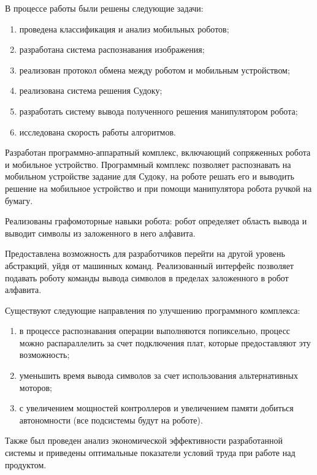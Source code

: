 \Conclusion %

В процессе работы были решены следующие задачи:

\begin{enumerate}
    \item проведена классификация и анализ мобильных роботов;
	\item разработана система распознавания изображения;
	\item реализован протокол обмена между роботом и мобильным устройством; 
	\item реализована система решения Судоку;
	\item разработать систему вывода полученного решения манипулятором робота;
	\item исследована скорость работы алгоритмов.
\end{enumerate}

Разработан программно-аппаратный комплекс, включающий сопряженных робота и мобильное устройство. Программный комплекс позволяет распознавать на мобильном устройстве задание для Судоку, на роботе решать его и выводить решение на мобильное устройство и при помощи манипулятора робота ручкой на бумагу.

Реализованы графомоторные навыки робота: робот определяет область вывода и выводит символы из заложенного в него алфавита.

Предоставлена возможность для разработчиков перейти на другой уровень абстракций, уйдя от машинных команд. Реализованный интерфейс позволяет подавать роботу команды вывода символов в пределах заложенного в робот алфавита.

Существуют следующие направления по улучшению программного комплекса:

\begin{enumerate}
    \item в процессе распознавания операции выполняются попиксельно, процесс можно распараллелить за счет подключения плат, которые предоставляют эту возможность;
	\item уменьшить время вывода символов за счет использования альтернативных моторов;
	\item с увеличением мощностей контроллеров и увеличением памяти добиться автономности (все подсистемы будут на роботе).
\end{enumerate}


Также был проведен анализ экономической эффективности разработанной системы и приведены оптимальные показатели условий труда при работе над продуктом.



